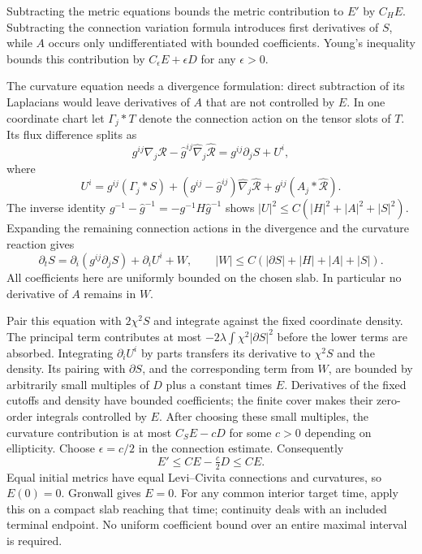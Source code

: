 Subtracting the metric equations bounds the metric contribution to $E'$
by $C_HE$.  Subtracting the connection variation formula introduces
first derivatives of $S$, while $A$ occurs only undifferentiated
with bounded coefficients.  Young's inequality bounds
this contribution by $C_\epsilon E+\epsilon D$ for any
$\epsilon>0$.

The curvature equation needs a divergence formulation: direct
subtraction of its Laplacians would leave derivatives of $A$ that
are not controlled by $E$.  In one coordinate chart let
$\Gamma_j*T$ denote the connection action on the tensor slots of
$T$.  Its flux difference splits as
\[
 g^{ij}\nabla_j\mathcal R-
       \widehat g^{ij}\widehat\nabla_j\widehat{\mathcal R}
       =g^{ij}\partial_j S+U^i,
\]
where
\[
 U^i=g^{ij}(\Gamma_j*S)
    +(g^{ij}-\widehat g^{ij})\widehat\nabla_j\widehat{\mathcal R}
    +g^{ij}(A_j*\widehat{\mathcal R}).
\]
The inverse identity
$g^{-1}-\widehat g^{-1}=-g^{-1}H\widehat g^{-1}$ shows
$|U|^2\leq C(|H|^2+|A|^2+|S|^2)$.
Expanding the remaining connection actions in the divergence and
the curvature reaction gives
\[
 \partial_t S=\partial_i(g^{ij}\partial_jS)+\partial_iU^i+W,
 \qquad
 |W|\leq C(|\partial S|+|H|+|A|+|S|).
\]
All coefficients here are uniformly bounded on the chosen slab.
In particular no derivative of $A$ remains in $W$.

Pair this equation with $2\chi^2S$ and integrate against the fixed
coordinate density.  The principal term contributes at most
$-2\lambda\int\chi^2|\partial S|^2$ before the lower terms
are absorbed.  Integrating $\partial_iU^i$ by parts transfers its
derivative to $\chi^2S$ and the density.  Its pairing with
$\partial S$, and the corresponding term from $W$, are bounded
by arbitrarily small multiples of $D$ plus a constant times $E$.
Derivatives of the fixed cutoffs and density have bounded coefficients;
the finite cover makes their zero-order integrals controlled by $E$.
After choosing these small multiples, the curvature contribution is
at most $C_SE-cD$ for some $c>0$ depending on ellipticity.
Choose $\epsilon=c/2$ in the connection estimate.  Consequently
\[
                         E'\leq CE-\tfrac c2D\leq CE.
\]
Equal initial metrics have equal Levi--Civita connections and curvatures,
so $E(0)=0$.  Gronwall gives $E=0$.  For any common interior target time,
apply this on a compact slab reaching that time; continuity deals with an
included terminal endpoint.  No uniform coefficient bound over an entire
maximal interval is required.

